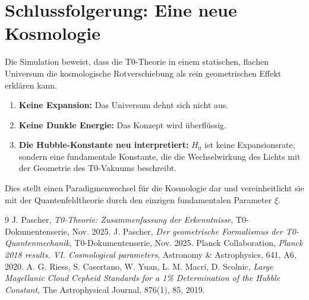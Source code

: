 	\section{Schlussfolgerung: Eine neue Kosmologie}
	Die Simulation beweist, dass die T0-Theorie in einem statischen, flachen Universum die kosmologische Rotverschiebung als rein geometrischen Effekt erklären kann.
	\begin{enumerate}
		\item \textbf{Keine Expansion:} Das Universum dehnt sich nicht aus.
		\item \textbf{Keine Dunkle Energie:} Das Konzept wird überflüssig.
		\item \textbf{Die Hubble-Konstante neu interpretiert:} $H_0$ ist keine Expansionsrate, sondern eine fundamentale Konstante, die die Wechselwirkung des Lichts mit der Geometrie des T0-Vakuums beschreibt.
	\end{enumerate}
	Dies stellt einen Paradigmenwechsel für die Kosmologie dar und vereinheitlicht sie mit der Quantenfeldtheorie durch den einzigen fundamentalen Parameter $\xi$.
	\begin{thebibliography}{9}
		J. Pascher, \textit{T0-Theorie: Zusammenfassung der Erkenntnisse}, T0-Dokumentenserie, Nov. 2025.
		J. Pascher, \textit{Der geometrische Formalismus der T0-Quantenmechanik}, T0-Dokumentenserie, Nov. 2025.
		Planck Collaboration, \textit{Planck 2018 results. VI. Cosmological parameters}, Astronomy \& Astrophysics, 641, A6, 2020.
		A. G. Riess, S. Casertano, W. Yuan, L. M. Macri, D. Scolnic, \textit{Large Magellanic Cloud Cepheid Standards for a 1\% Determination of the Hubble Constant}, The Astrophysical Journal, 876(1), 85, 2019.
	\end{thebibliography}
